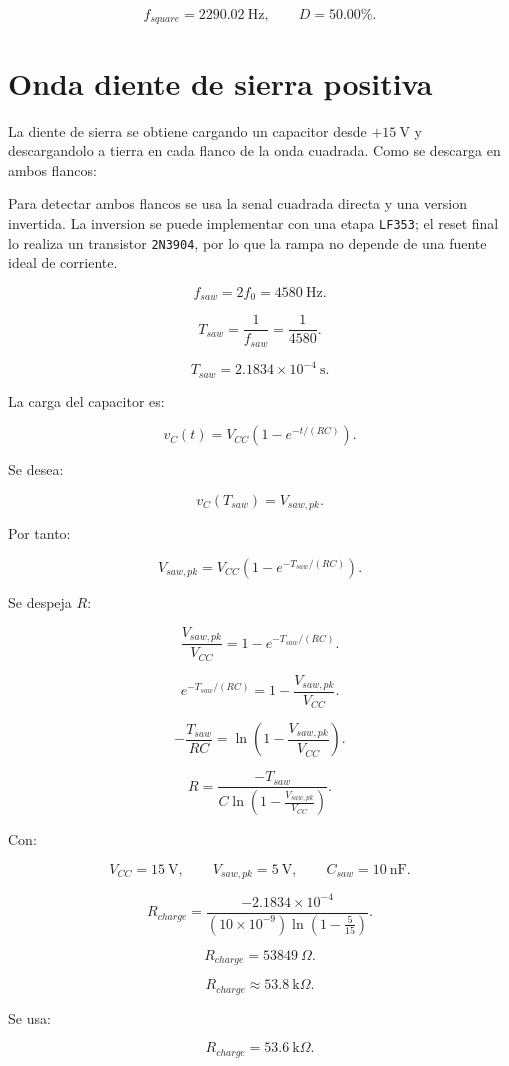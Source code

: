 \documentclass[11pt,letterpaper]{article}
\begin{document}
\[
f_{square}=2290.02~\text{Hz},
\qquad
D=50.00\%.
\]

\section{Onda diente de sierra positiva}

La diente de sierra se obtiene cargando un capacitor desde \(+15~\text{V}\) y
descargandolo a tierra en cada flanco de la onda cuadrada. Como se descarga en
ambos flancos:

Para detectar ambos flancos se usa la senal cuadrada directa y una version
invertida. La inversion se puede implementar con una etapa \texttt{LF353}; el
reset final lo realiza un transistor \texttt{2N3904}, por lo que la rampa no
depende de una fuente ideal de corriente.

\[
f_{saw}=2f_0=4580~\text{Hz}.
\]

\[
T_{saw}=\frac{1}{f_{saw}}
=
\frac{1}{4580}.
\]

\[
T_{saw}=2.1834\times10^{-4}~\text{s}.
\]

La carga del capacitor es:

\[
v_C(t)=V_{CC}\left(1-e^{-t/(RC)}\right).
\]

Se desea:

\[
v_C(T_{saw})=V_{saw,pk}.
\]

Por tanto:

\[
V_{saw,pk}=V_{CC}\left(1-e^{-T_{saw}/(RC)}\right).
\]

Se despeja \(R\):

\[
\frac{V_{saw,pk}}{V_{CC}}
=
1-e^{-T_{saw}/(RC)}.
\]

\[
e^{-T_{saw}/(RC)}
=
1-\frac{V_{saw,pk}}{V_{CC}}.
\]

\[
-\frac{T_{saw}}{RC}
=
\ln\left(1-\frac{V_{saw,pk}}{V_{CC}}\right).
\]

\[
R=
\frac{-T_{saw}}
{C\ln\left(1-\frac{V_{saw,pk}}{V_{CC}}\right)}.
\]

Con:

\[
V_{CC}=15~\text{V},
\qquad
V_{saw,pk}=5~\text{V},
\qquad
C_{saw}=10~\text{nF}.
\]

\[
R_{charge}
=
\frac{-2.1834\times10^{-4}}
{(10\times10^{-9})\ln\left(1-\frac{5}{15}\right)}.
\]

\[
R_{charge}=53849~\Omega.
\]

\[
\boxed{R_{charge}\approx53.8~\text{k}\Omega}.
\]

Se usa:

\[
\boxed{R_{charge}=53.6~\text{k}\Omega}.
\]
\end{document}
